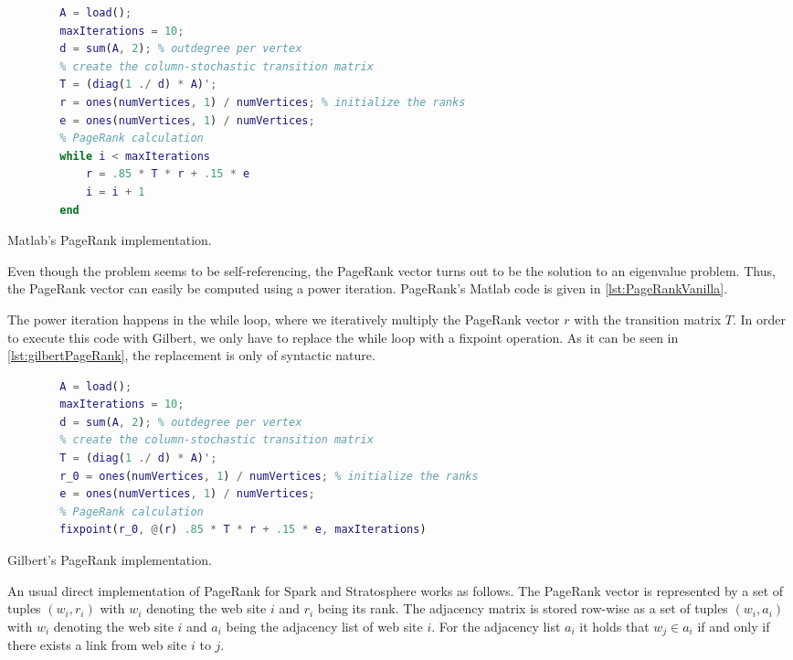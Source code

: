 \begin{listing}[!h]
	\begin{CenteredBox}
		\begin{lstlisting}[language=Matlab]
		% load adjacency matrix
		A = load(); 
		maxIterations = 10;
		d = sum(A, 2); % outdegree per vertex
		% create the column-stochastic transition matrix
		T = (diag(1 ./ d) * A)'; 
		r = ones(numVertices, 1) / numVertices; % initialize the ranks
		e = ones(numVertices, 1) / numVertices;
		% PageRank calculation
		while i < maxIterations
			r = .85 * T * r + .15 * e
			i = i + 1
		end
		\end{lstlisting}
	\end{CenteredBox}
	\caption{Matlab's PageRank implementation.}
	\label{lst:PageRankVanilla}
\end{listing}

Even though the problem seems to be self-referencing, the PageRank vector turns out to be the solution to an eigenvalue problem.
Thus, the PageRank vector can easily be computed using a power iteration.
PageRank's Matlab code is given in \cref{lst:PageRankVanilla}.

The power iteration happens in the while loop, where we iteratively multiply the PageRank vector $r$ with the transition matrix $T$.
In order to execute this code with Gilbert, we only have to replace the while loop with a fixpoint operation.
As it can be seen in \cref{lst:gilbertPageRank}, the replacement is only of syntactic nature.

\begin{listing}[!h]
	\begin{CenteredBox}
		\begin{lstlisting}[language=Matlab]
		% load adjacency matrix
		A = load();
		maxIterations = 10;
		d = sum(A, 2); % outdegree per vertex
		% create the column-stochastic transition matrix
		T = (diag(1 ./ d) * A)'; 
		r_0 = ones(numVertices, 1) / numVertices; % initialize the ranks
		e = ones(numVertices, 1) / numVertices;
		% PageRank calculation
		fixpoint(r_0, @(r) .85 * T * r + .15 * e, maxIterations)
		\end{lstlisting}
	\end{CenteredBox}
	\caption{Gilbert's PageRank implementation.}
	\label{lst:gilbertPageRank}
\end{listing}

An usual direct implementation of PageRank for Spark and Stratosphere works as follows.
The PageRank vector is represented by a set of tuples $(w_i, r_i)$ with $w_i$ denoting the web site $i$ and $r_i$ being its rank.
The adjacency matrix is stored row-wise as a set of tuples $(w_i, a_i)$ with $w_i$ denoting the web site $i$ and $a_i$ being the adjacency list of web site $i$.
For the adjacency list $a_i$ it holds that $w_j \in a_i$ if and only if there exists a link from web site $i$ to $j$.

